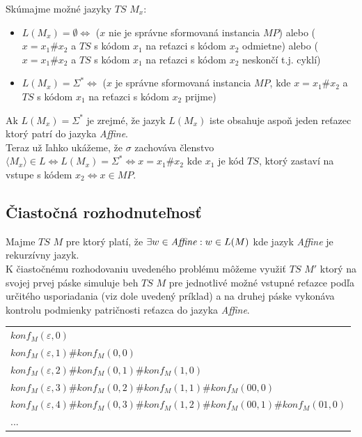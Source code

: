 \documentclass[11pt,a4paper]{article}
\begin{document}
Skúmajme možné jazyky $TS$ $M_x$:

\begin{itemize}
    \item $L(M_x) = \emptyset \Longleftrightarrow $ ($x$ nie je správne sformovaná instancia $MP$) alebo ($x=x_1\#x_2$ a $TS$ s kódom $x_1$ na reťazci s kódom $x_2$ odmietne) alebo ($x=x_1\#x_2$ a $TS$ s kódom $x_1$ na reťazci s kódom $x_2$ neskončí t.j. cyklí)
    \item $L(M_x) = \Sigma^* \Longleftrightarrow $ ($x$ je správne sformovaná instancia $MP$, kde $x=x_1\#x_2$ a $TS$ s kódom $x_1$ na reťazci s kódom $x_2$ prijme)
\end{itemize}

Ak $L(M_x) = \Sigma^*$ je zrejmé, že jazyk $L(M_x)$ iste obsahuje aspoň jeden reťazec ktorý patrí do jazyka \textit{Affine}.\\

Teraz už ľahko ukážeme, že $\sigma$ zachováva členstvo $\langle M_{x} \rangle \in L \Leftrightarrow L(M_x) = \Sigma^{*} \Leftrightarrow x=x_1\#x_2$ kde $x_1$ je kód $TS$, ktorý zastaví na vstupe s kódem $x_2 \Leftrightarrow x \in MP$.


\newpage
\subsection{Čiastočná rozhodnuteľnosť}

Majme $TS$ $M$ pre ktorý platí, že $\exists w \in \text{\textit{Affine}}: w \in L(M)$ kde jazyk \textit{Affine} je rekurzívny jazyk.\\

K čiastočnému rozhodovaniu uvedeného problému môžeme využiť $TS$ $M'$ ktorý na svojej prvej páske simuluje beh $TS$ $M$ pre jednotlivé možné vstupné reťazce podľa určitého usporiadania (viz dole uvedený príklad) a na druhej páske vykonáva kontrolu podmienky patričnosti reťazca do jazyka \textit{Affine}.

\begin{center}
    \begin{tabular}{l}
        $konf_M(\varepsilon,0)$\\
        $konf_M(\varepsilon,1)\#konf_M(0,0)$\\
        $konf_M(\varepsilon,2)\#konf_M(0,1)\#konf_M(1,0)$\\
        $konf_M(\varepsilon,3)\#konf_M(0,2)\#konf_M(1,1)\#konf_M(00,0)$\\
        $konf_M(\varepsilon,4)\#konf_M(0,3)\#konf_M(1,2)\#konf_M(00,1)\#konf_M(01,0)$\\
        ...
    \end{tabular}
\end{center}
\end{document}
